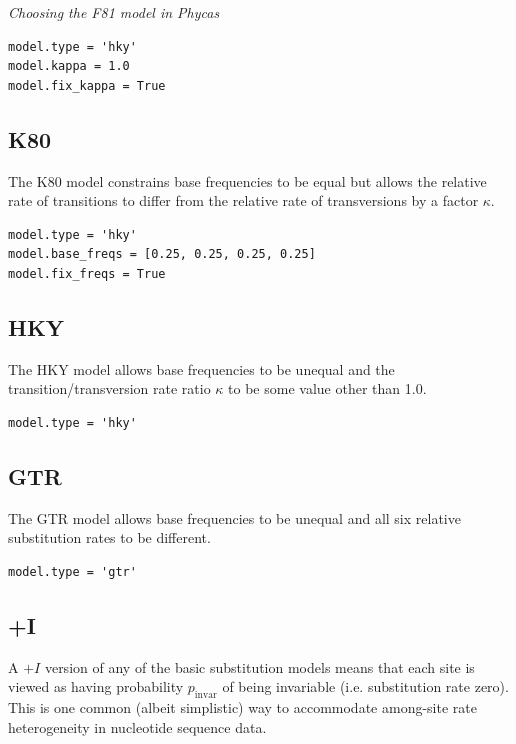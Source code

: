 \documentclass[10pt]{article}
\newcommand{\pinvar}{\mbox{$p_{\mbox{invar}}$}}
\begin{document}
{\large \em Choosing the F81 model in Phycas}
\begin{verbatim}
model.type = 'hky'
model.kappa = 1.0
model.fix_kappa = True
\end{verbatim}

\subsection{K80}
The K80 model \citep{Kimura1980} constrains base frequencies to be equal but allows the relative rate of transitions to differ from the relative rate of transversions by a factor $\kappa$.

\begin{verbatim}
model.type = 'hky'
model.base_freqs = [0.25, 0.25, 0.25, 0.25]
model.fix_freqs = True
\end{verbatim}

\subsection{HKY}
The HKY model \citep{HasegawaKishinoYano1985} allows base frequencies to be unequal and the transition/transversion rate ratio $\kappa$ to be some value other than 1.0.

\begin{verbatim}
model.type = 'hky'
\end{verbatim}

\subsection{GTR}
The GTR model \citep{LanavePreparataSacconeSerio1984} allows base frequencies to be unequal and all six relative substitution rates to be different.

\begin{verbatim}
model.type = 'gtr'
\end{verbatim}

\subsection{+I}
A $+I$ version \citep{Reeves1992} of any of the basic substitution models means that each site is viewed as having probability $\pinvar$ of being invariable (i.e. substitution rate zero). This is one common (albeit simplistic) way to accommodate among-site rate heterogeneity in nucleotide sequence data.
\end{document}

